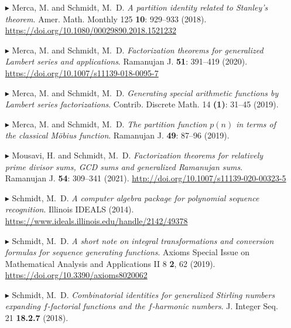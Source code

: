 \documentclass[10pt,letterpaper,sans]{moderncv}        %
\begin{document}
\begin{itemize}
\setlength{\itemsep}{0.75mm} 

\item[$\blacktriangleright$]
Merca, M. and Schmidt, M.~D. \emph{A partition identity related to Stanley's theorem}. 
Amer. Math. Monthly 125 {\bfseries 10}: 929--933 (2018). 
\url{https://doi.org/10.1080/00029890.2018.1521232}

\item[$\blacktriangleright$]
Merca, M. and Schmidt, M.~D. \emph{Factorization theorems for generalized Lambert series and applications}. 
Ramanujan J. {\bfseries 51}: 391--419 (2020). 
\url{https://doi.org/10.1007/s11139-018-0095-7}

\item[$\blacktriangleright$]
Merca, M. and Schmidt, M.~D. \emph{Generating special arithmetic functions by Lambert series factorizations}. 
Contrib. Discrete Math. 14 {\bfseries (1)}: 31--45 (2019). 

\item[$\blacktriangleright$]
Merca, M. and Schmidt, M.~D. \emph{The partition function $p(n)$ in terms of the classical M\"{o}bius function}. 
Ramanujan J. {\bfseries 49}: 87--96 (2019). 

\item[$\blacktriangleright$]
Mousavi, H. and Schmidt, M.~D. \emph{Factorization theorems for relatively prime divisor sums, 
                                     GCD sums and generalized Ramanujan sums}. 
Ramanujan J. {\bfseries 54}: 309--341 (2021). 
\url{http://doi.org/10.1007/s11139-020-00323-5} 

\item[$\blacktriangleright$]
Schmidt, M.~D. \emph{A computer algebra package for polynomial sequence recognition}. 
Illinois IDEALS (2014). 
\url{https://www.ideals.illinois.edu/handle/2142/49378}

\item[$\blacktriangleright$]
Schmidt, M.~D. \emph{A short note on integral transformations and 
                     conversion formulas for sequence generating functions}. 
Axioms Special Issue on Mathematical Analysis and Applications II 8 {\bfseries 2}, 62 (2019). 
\url{https://doi.org/10.3390/axioms8020062} 

\item[$\blacktriangleright$]
Schmidt, M.~D. \emph{Combinatorial identities for generalized Stirling numbers 
                     expanding $f$-factorial functions and the $f$-harmonic numbers}. 
J. Integer Seq. 21 {\bfseries 18.2.7} (2018). 


\end{itemize}
\end{document}

